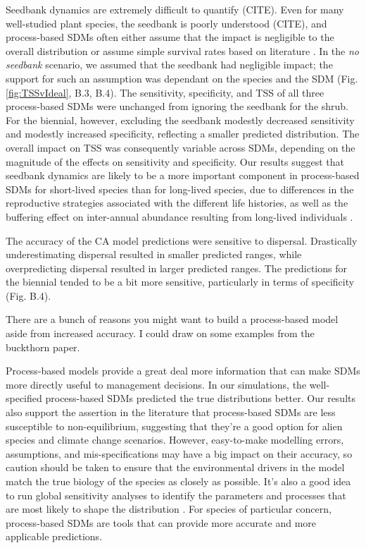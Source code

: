\documentclass[preprint,review,times,12pt]{elsarticle}
\begin{document}
Seedbank dynamics are extremely difficult to quantify (CITE). Even for many well-studied plant species, the seedbank is poorly understood (CITE), and process-based SDMs often either assume that the impact is negligible to the overall distribution \citep{Merow2017} or assume simple survival rates based on literature \citep{Szewczyk2019}. In the \emph{no seedbank} scenario, we assumed that the seedbank had negligible impact; the support for such an assumption was dependant on the species and the SDM (Fig. \ref{fig:TSSvIdeal}, B.3, B.4). The sensitivity, specificity, and TSS of all three process-based SDMs were unchanged from ignoring the seedbank for the shrub. For the biennial, however, excluding the seedbank modestly decreased sensitivity and modestly increased specificity, reflecting a smaller predicted distribution. The overall impact on TSS was consequently variable across SDMs, depending on the magnitude of the effects on sensitivity and specificity. Our results suggest that seedbank dynamics are likely to be a more important component in process-based SDMs for short-lived species than for long-lived species, due to differences in the reproductive strategies associated with the different life histories, as well as the buffering effect on inter-annual abundance resulting from long-lived individuals \citep{Morris2003}.

The accuracy of the CA model predictions were sensitive to dispersal. Drastically underestimating dispersal resulted in smaller predicted ranges, while overpredicting dispersal resulted in larger predicted ranges. The predictions for the biennial tended to be a bit more sensitive, particularly in terms of specificity (Fig. B.4). 

There are a bunch of reasons you might want to build a process-based model aside from increased accuracy. I could draw on some examples from the buckthorn paper.

Process-based models provide a great deal more information that can make SDMs more directly useful to management decisions. In our simulations, the well-specified process-based SDMs predicted the true distributions better. Our results also support the assertion in the literature that process-based SDMs are less susceptible to non-equilibrium, suggesting that they're a good option for alien species and climate change scenarios. However, easy-to-make modelling errors, assumptions, and mis-specifications may have a big impact on their accuracy, so caution should be taken to ensure that the environmental drivers in the model match the true biology of the species as closely as possible. It's also a good idea to run global sensitivity analyses to identify the parameters and processes that are most likely to shape the distribution \citep{Prowse2016,Aiello-Lammens2017}. For species of particular concern, process-based SDMs are tools that can provide more accurate and more applicable predictions.
\end{document}
